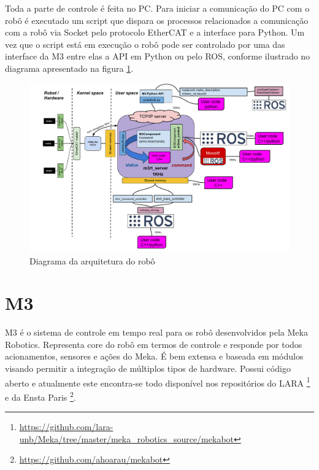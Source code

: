 Toda a parte de controle é feita no PC. Para iniciar a comunicação do PC com o robô é executado um script que dispara os processos relacionados a comunicação com a robô via Socket pelo protocolo EtherCAT e a interface para Python. Um vez que o script está em execução o robô pode ser controlado por uma das interface da M3 entre elas a API em Python ou pelo ROS, conforme ilustrado no diagrama apresentado na figura \ref{fig:mekaarch}.

\begin{figure}[H]
    \centering
    \includegraphics[width=0.9\linewidth]{figs/m3_arch.pdf}
    \caption{Diagrama da arquitetura do robô \cite{hoarau_2015}}
    \label{fig:mekaarch}
\end{figure}

\section{M3}

M3 é o sistema de controle em tempo real para os robô desenvolvidos pela Meka Robotics. Representa core do robô em termos de controle e responde por todos acionamentos, sensores e ações do Meka. É bem extensa e baseada em módulos visando permitir a integração de múltiplos tipos de hardware. Possui código aberto e atualmente este encontra-se todo disponível nos repositórios do LARA \footnote{\url{https://github.com/lara-unb/Meka/tree/master/meka_robotics_source/mekabot}} e da Ensta Paris \footnote{\url{https://github.com/ahoarau/mekabot}}.



